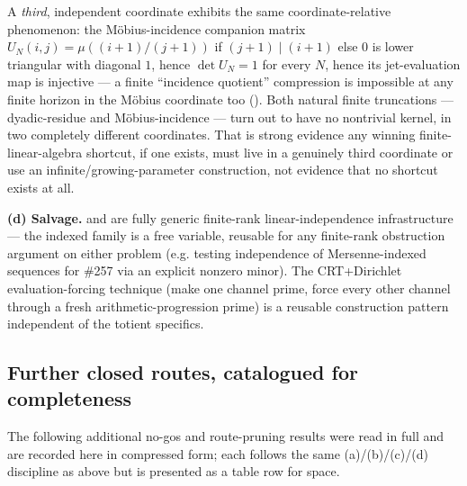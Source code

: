 A \emph{third}, independent coordinate exhibits
the same coordinate-relative phenomenon: the Möbius-incidence companion
matrix \(U_N(i,j)=\mu((i+1)/(j+1))\) if \((j+1)\mid(i+1)\) else \(0\) is
lower triangular with diagonal \(1\), hence \(\det U_N=1\) for every \(N\),
hence its jet-evaluation map is injective — a finite ``incidence quotient''
compression is impossible at any finite horizon in the Möbius coordinate too
(). Both natural finite
truncations — dyadic-residue and Möbius-incidence — turn out to have no
nontrivial kernel, in two completely different coordinates. That is strong
evidence any winning finite-linear-algebra shortcut, if one exists, must
live in a genuinely third coordinate or use an infinite/growing-parameter
construction, not evidence that no shortcut exists at all.

\textbf{(d) Salvage.}  and
 are fully generic finite-rank
linear-independence infrastructure — the indexed family is a free variable,
reusable for any finite-rank obstruction argument on either problem (e.g.
testing independence of Mersenne-indexed sequences for \#257 via an explicit
nonzero minor). The CRT+Dirichlet evaluation-forcing technique (make one
channel prime, force every other channel through a fresh arithmetic-progression
prime) is a reusable construction pattern independent of the totient
specifics.

\subsection{Further closed routes, catalogued for completeness}

The following additional no-gos and route-pruning results were read in full
and are recorded here in compressed form; each follows the same (a)/(b)/(c)/(d)
discipline as above but is presented as a table row for space.

